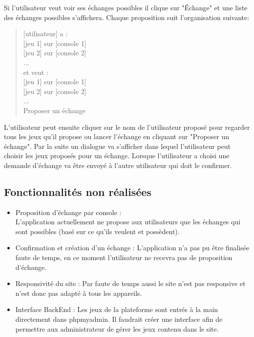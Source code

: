 \documentclass[a4paper,12pt,abstracton,titlepage]{scrartcl}
\begin{document}
Si l'utilisateur veut voir ses échanges possibles il clique sur "Échange" et une liste des échanges possibles s'affichera. Chaque proposition suit l'organisation suivante:\\

\begin{quote}
{[utilisateur]} a :\\
{[jeu 1]} sur {[console 1]}\\
{[jeu 2]} sur {[console 2]}\\
...\\
et veut :\\
{[jeu 1]} sur {[console 1]}\\
{[jeu 2]} sur {[console 2]}\\
...\\
Proposer un échange\\
\end{quote}

L'utilisateur peut ensuite cliquer sur le nom de l'utilisateur proposé pour regarder tous les jeux qu'il propose ou lancer l'échange en cliquant sur "Proposer un échange". Par la suite un dialogue va s'afficher dans lequel l'utilisateur peut choisir les jeux proposés pour un échange. Lorsque l'utilisateur a choisi une demande d'échange va être envoyé à l'autre utilisateur qui doit le confirmer.

\newpage
\subsection{Fonctionnalités non réalisées}
\begin{itemize}
\item Proposition d'échange par console :\\
L'application actuellement ne propose aux utilisateurs que les échanges qui sont possibles (basé sur ce qu'ils veulent et possèdent).
\item Confirmation et création d'un échange : L'application n'a pas pu être finalisée faute de temps, en ce moment l'utilisateur ne recevra pas de proposition d'échange.
\item Responsivité du site : Par faute de temps aussi le site n'est pas responsive et n'est donc pas adapté à tous les appareils.
\item Interface BackEnd : Les jeux de la plateforme sont entrés à la main directement dans phpmyadmin. Il faudrait créer une interface afin de permettre aux administrateur de gérer les jeux contenu dans le site.
\end{itemize}
\end{document}
